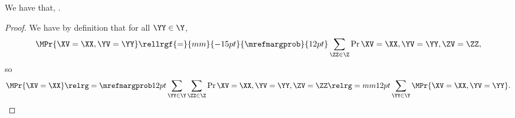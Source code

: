 \begin{proposition}
  We have that, \mprobgprop.%
\end{proposition}

\begin{proof}
  We have by definition that for all $\YY \in \Y$,
  $$\MPr{\XV = \XX, \YV = \YY} \rellrgf{=}{mm}{-15pt}{\mrefmargprob}{12pt} \sum_{\ZZ \in \Z}\Pr{\XV = \XX, \YV = \YY, \ZV = \ZZ},$$
  so
  $$\MPr{\XV = \XX} \relrg = {\mrefmargprob} 12pt \sum_{\YY \in \Y}\sum_{\ZZ \in \Z}\Pr{\XV = \XX, \YV = \YY, \ZV = \ZZ} \relrg = mm 12pt
  \sum_{\YY \in \Y}\MPr{\XV = \XX, \YV = \YY}.$$%
\end{proof}

